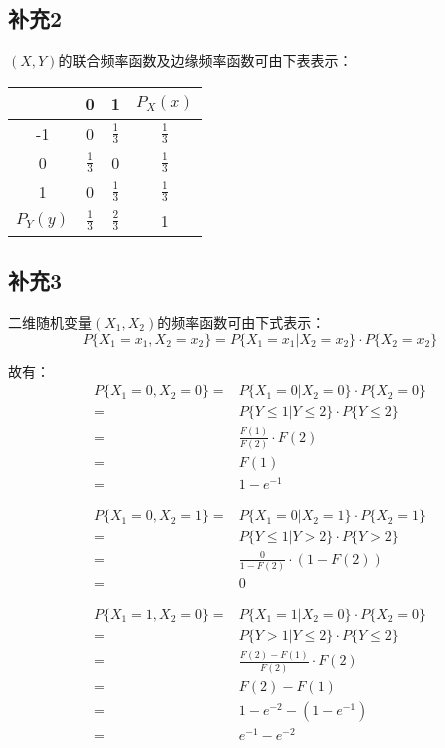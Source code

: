 \documentclass[a4paper,12pt]{ctexart}
\begin{document}
\subsection*{补充2}

$(X,Y)$的联合频率函数及边缘频率函数可由下表表示：
\begin{center}
	\begin{tabular}{c|cc|c}
		\diagbox{$X$}{$Y$} & 0 & 1 & $P_X(x)$ \\ \hline
		-1 & 0 & $\frac{1}{3}$ & $\frac{1}{3}$ \\
		0 & $\frac{1}{3}$ & 0 & $\frac{1}{3}$ \\
		1 & 0 & $\frac{1}{3}$ & $\frac{1}{3}$ \\ \hline
		$P_Y(y)$ & $\frac{1}{3}$ & $\frac{2}{3}$ & 1
	\end{tabular}
\end{center}

\subsection*{补充3}

二维随机变量$(X_1, X_2)$的频率函数可由下式表示：
\begin{equation*}
	P\{X_1 = x_1, X_2 = x_2\} = P\{X_1 = x_1 | X_2 = x_2\} \cdot P\{X_2 = x_2\}
\end{equation*}

故有：
\begin{align*}
	P\{X_1 = 0, X_2 = 0\} =& P\{X_1 = 0 | X_2 = 0\} \cdot P\{X_2 = 0\} \\
	=& P\{Y \leq 1 | Y \leq 2\} \cdot P\{Y \leq 2\} \\
	=& \frac{F(1)}{F(2)} \cdot F(2) \\
	=& F(1) \\
	=& 1 - e^{-1}
\end{align*}

\begin{align*}
	P\{X_1 = 0, X_2 = 1\} =& P\{X_1 = 0 | X_2 = 1\} \cdot P\{X_2 = 1\} \\
	=& P\{Y \leq 1 | Y > 2\} \cdot P\{Y > 2\} \\
	=& \frac{0}{1 - F(2)} \cdot (1 - F(2)) \\
	=& 0
\end{align*}

\begin{align*}
	P\{X_1 = 1, X_2 = 0\} =& P\{X_1 = 1 | X_2 = 0\} \cdot P\{X_2 = 0\} \\
	=& P\{Y > 1 | Y \leq 2\} \cdot P\{Y \leq 2\} \\
	=& \frac{F(2) - F(1)}{F(2)} \cdot F(2) \\
	=& F(2) - F(1) \\
	=& 1 - e^{-2} - (1 - e^{-1}) \\
	=& e^{-1} - e^{-2}
\end{align*}
\end{document}
